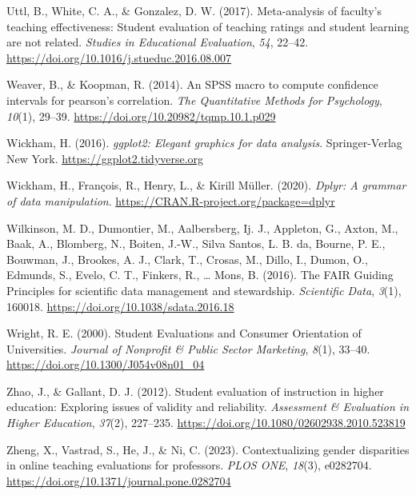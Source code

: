 \documentclass[
  man,mask]{apa7}
\newlength{\cslhangindent}
\newenvironment{CSLReferences}[2] %
 {\begin{list}{}{%
  \setlength{\itemindent}{0pt}
  \setlength{\leftmargin}{0pt}
  \setlength{\parsep}{0pt}
  \ifodd #1
   \setlength{\leftmargin}{\cslhangindent}
   \setlength{\itemindent}{-1\cslhangindent}
  \fi
  \setlength{\itemsep}{#2\baselineskip}}}
 {\end{list}}
\begin{document}
\begin{CSLReferences}{1}{0}
Uttl, B., White, C. A., \& Gonzalez, D. W. (2017). Meta-analysis of faculty's teaching effectiveness: Student evaluation of teaching ratings and student learning are not related. \emph{Studies in Educational Evaluation}, \emph{54}, 22--42. \url{https://doi.org/10.1016/j.stueduc.2016.08.007}

Weaver, B., \& Koopman, R. (2014). An SPSS macro to compute confidence intervals for pearson{'}s correlation. \emph{The Quantitative Methods for Psychology}, \emph{10}(1), 29--39. \url{https://doi.org/10.20982/tqmp.10.1.p029}

Wickham, H. (2016). \emph{ggplot2: Elegant graphics for data analysis}. Springer-Verlag New York. \url{https://ggplot2.tidyverse.org}

Wickham, H., François, R., Henry, L., \& Kirill Müller. (2020). \emph{Dplyr: A grammar of data manipulation}. \url{https://CRAN.R-project.org/package=dplyr}

Wilkinson, M. D., Dumontier, M., Aalbersberg, Ij. J., Appleton, G., Axton, M., Baak, A., Blomberg, N., Boiten, J.-W., Silva Santos, L. B. da, Bourne, P. E., Bouwman, J., Brookes, A. J., Clark, T., Crosas, M., Dillo, I., Dumon, O., Edmunds, S., Evelo, C. T., Finkers, R., \ldots{} Mons, B. (2016). The FAIR Guiding Principles for scientific data management and stewardship. \emph{Scientific Data}, \emph{3}(1), 160018. \url{https://doi.org/10.1038/sdata.2016.18}

Wright, R. E. (2000). Student Evaluations and Consumer Orientation of Universities. \emph{Journal of Nonprofit \& Public Sector Marketing}, \emph{8}(1), 33--40. \url{https://doi.org/10.1300/J054v08n01_04}

Zhao, J., \& Gallant, D. J. (2012). Student evaluation of instruction in higher education: Exploring issues of validity and reliability. \emph{Assessment \& Evaluation in Higher Education}, \emph{37}(2), 227--235. \url{https://doi.org/10.1080/02602938.2010.523819}

Zheng, X., Vastrad, S., He, J., \& Ni, C. (2023). Contextualizing gender disparities in online teaching evaluations for professors. \emph{PLOS ONE}, \emph{18}(3), e0282704. \url{https://doi.org/10.1371/journal.pone.0282704}

\end{CSLReferences}
\end{document}
